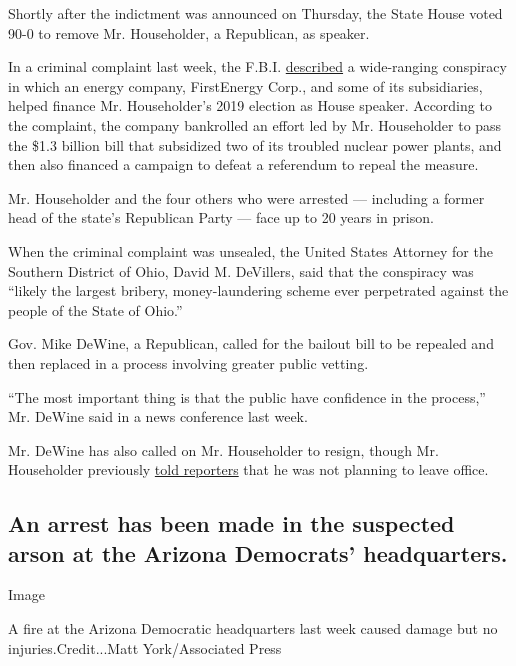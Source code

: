 Shortly after the indictment was announced on Thursday, the State House
voted 90-0 to remove Mr. Householder, a Republican, as speaker.

In a criminal complaint last week, the F.B.I.
\href{https://www.nytimes3xbfgragh.onion/2020/07/21/us/larry-householder-ohio-speaker-arrested.html}{described}
a wide-ranging conspiracy in which an energy company, FirstEnergy Corp.,
and some of its subsidiaries, helped finance Mr. Householder's 2019
election as House speaker. According to the complaint, the company
bankrolled an effort led by Mr. Householder to pass the \$1.3 billion
bill that subsidized two of its troubled nuclear power plants, and then
also financed a campaign to defeat a referendum to repeal the measure.

Mr. Householder and the four others who were arrested --- including a
former head of the state's Republican Party --- face up to 20 years in
prison.

When the criminal complaint was unsealed, the United States Attorney for
the Southern District of Ohio, David M. DeVillers, said that the
conspiracy was ``likely the largest bribery, money-laundering scheme
ever perpetrated against the people of the State of Ohio.''

Gov. Mike DeWine, a Republican, called for the bailout bill to be
repealed and then replaced in a process involving greater public
vetting.

``The most important thing is that the public have confidence in the
process,'' Mr. DeWine said in a news conference last week.

Mr. DeWine has also called on Mr. Householder to resign, though Mr.
Householder previously
\href{https://www.cleveland.com/open/2020/07/house-speaker-larry-householder-says-he-wont-resign-despite-arrest.html}{told
reporters} that he was not planning to leave office.

\hypertarget{an-arrest-has-been-made-in-the-suspected-arson-at-the-arizona-democrats-headquarters}{%
\subsection{An arrest has been made in the suspected arson at the
Arizona Democrats'
headquarters.}\label{an-arrest-has-been-made-in-the-suspected-arson-at-the-arizona-democrats-headquarters}}

Image

A fire at the Arizona Democratic headquarters last week caused damage
but no injuries.Credit...Matt York/Associated Press

